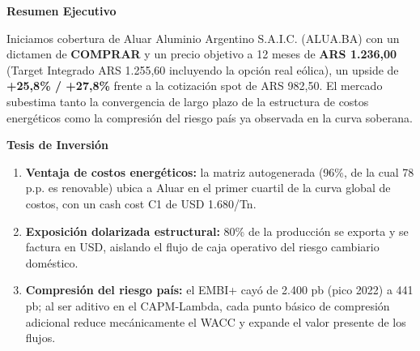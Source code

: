 \documentclass[10pt,a4paper]{article}
\newcommand{\coverheading}[1]{{\georgiahead\bfseries\color{gsnavy}\large #1}\par\vspace{2pt}}
\begin{document}
\noindent
\begin{minipage}[t]{0.54\textwidth}
    \coverheading{Resumen Ejecutivo}
    {\small Iniciamos cobertura de Aluar Aluminio Argentino S.A.I.C. (ALUA.BA) con un dictamen de \textbf{COMPRAR} y un precio objetivo a 12 meses de \textbf{ARS 1.236,00} (Target Integrado ARS 1.255,60 incluyendo la opci\'on real e\'olica), un upside de \textbf{+25,8\% / +27,8\%} frente a la cotizaci\'on spot de ARS 982,50. El mercado subestima tanto la convergencia de largo plazo de la estructura de costos energ\'eticos como la compresi\'on del riesgo pa\'is ya observada en la curva soberana.}

    \vspace{0.2cm}
    \coverheading{Tesis de Inversi\'on}
    \begin{enumerate}
        \setlength{\itemsep}{3pt}
        \item \textbf{Ventaja de costos energ\'eticos:} la matriz autogenerada (96\%, de la cual 78 p.p. es renovable) ubica a Aluar en el primer cuartil de la curva global de costos, con un cash cost C1 de USD 1.680/Tn.
        \item \textbf{Exposici\'on dolarizada estructural:} 80\% de la producci\'on se exporta y se factura en USD, aislando el flujo de caja operativo del riesgo cambiario dom\'estico.
        \item \textbf{Compresi\'on del riesgo pa\'is:} el EMBI+ cay\'o de 2.400 pb (pico 2022) a 441 pb; al ser aditivo en el CAPM-Lambda, cada punto b\'asico de compresi\'on adicional reduce mec\'anicamente el WACC y expande el valor presente de los flujos.
    \end{enumerate}
\end{minipage}%
\hfill
\end{document}
